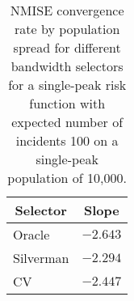 \begin{table}[htbp]
\begin{center}
\begin{tabular}{lr}
\toprule
\multicolumn{1}{c}{Selector}&\multicolumn{1}{c}{Slope}\tabularnewline
\midrule
Oracle&$-2.643$\tabularnewline
Silverman&$-2.294$\tabularnewline
CV&$-2.447$\tabularnewline
\bottomrule
\end{tabular}
\caption[NMISE Convergence rate by population spread for 100 cases]{NMISE convergence rate by population spread for different bandwidth selectors for a single-peak risk function with expected number of incidents 100 on a single-peak population of 10,000.\label{tab:results:nmise_convergence_by_population_spread}}\end{center}
\end{table}
